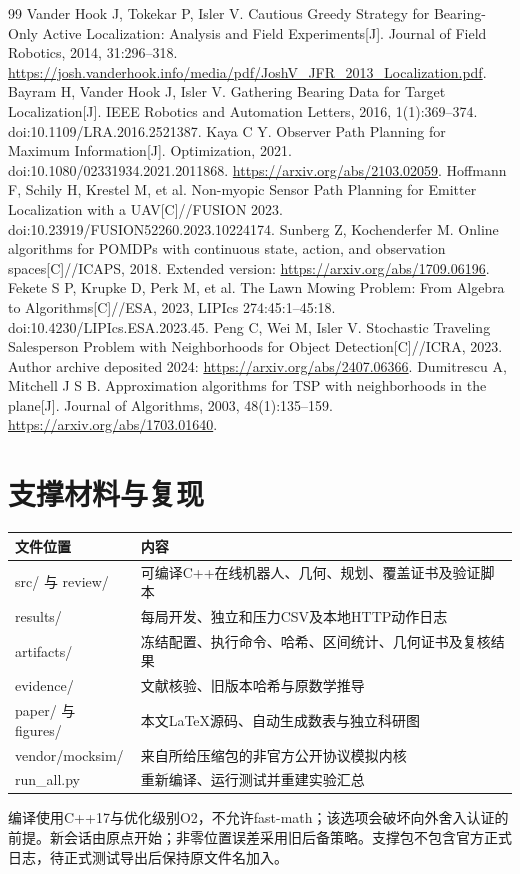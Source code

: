 \documentclass[UTF8,a4paper,zihao=-4,fontset=mac]{ctexart}
\begin{document}
\begin{thebibliography}{99}\small
{} Vander Hook J, Tokekar P, Isler V. Cautious Greedy Strategy for Bearing-Only Active Localization: Analysis and Field Experiments[J]. Journal of Field Robotics, 2014, 31:296--318. \url{https://josh.vanderhook.info/media/pdf/JoshV_JFR_2013_Localization.pdf}.
 Bayram H, Vander Hook J, Isler V. Gathering Bearing Data for Target Localization[J]. IEEE Robotics and Automation Letters, 2016, 1(1):369--374. doi:10.1109/LRA.2016.2521387.
 Kaya C Y. Observer Path Planning for Maximum Information[J]. Optimization, 2021. doi:10.1080/02331934.2021.2011868. \url{https://arxiv.org/abs/2103.02059}.
 Hoffmann F, Schily H, Krestel M, et al. Non-myopic Sensor Path Planning for Emitter Localization with a UAV[C]//FUSION 2023. doi:10.23919/FUSION52260.2023.10224174.
 Sunberg Z, Kochenderfer M. Online algorithms for POMDPs with continuous state, action, and observation spaces[C]//ICAPS, 2018. Extended version: \url{https://arxiv.org/abs/1709.06196}.
 Fekete S P, Krupke D, Perk M, et al. The Lawn Mowing Problem: From Algebra to Algorithms[C]//ESA, 2023, LIPIcs 274:45:1--45:18. doi:10.4230/LIPIcs.ESA.2023.45.
 Peng C, Wei M, Isler V. Stochastic Traveling Salesperson Problem with Neighborhoods for Object Detection[C]//ICRA, 2023. Author archive deposited 2024: \url{https://arxiv.org/abs/2407.06366}.
 Dumitrescu A, Mitchell J S B. Approximation algorithms for TSP with neighborhoods in the plane[J]. Journal of Algorithms, 2003, 48(1):135--159. \url{https://arxiv.org/abs/1703.01640}.
\end{thebibliography}
\label{mainbodyend}
\clearpage\appendix
\section{支撑材料与复现}
\begin{longtable}{p{4.4cm}p{10cm}}\toprule 文件位置&内容\\\midrule\endhead
src/ 与 review/ & 可编译C++在线机器人、几何、规划、覆盖证书及验证脚本\\
results/ & 每局开发、独立和压力CSV及本地HTTP动作日志\\
artifacts/ & 冻结配置、执行命令、哈希、区间统计、几何证书及复核结果\\
evidence/ & 文献核验、旧版本哈希与原数学推导\\
paper/ 与 figures/ & 本文LaTeX源码、自动生成数表与独立科研图\\
vendor/mocksim/ & 来自所给压缩包的非官方公开协议模拟内核\\
run\_all.py & 重新编译、运行测试并重建实验汇总\\\bottomrule\end{longtable}
编译使用C++17与优化级别O2，不允许fast-math；该选项会破坏向外舍入认证的前提。新会话由原点开始；非零位置误差采用旧后备策略。支撑包不包含官方正式日志，待正式测试导出后保持原文件名加入。

\end{document}
